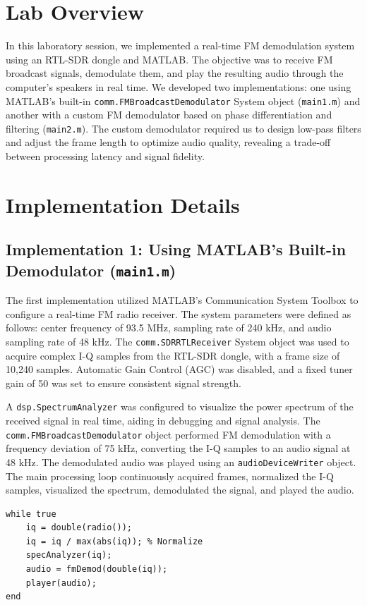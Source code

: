 \documentclass{article}
\begin{document}
\section*{Lab Overview}
In this laboratory session, we implemented a real-time FM demodulation system using an RTL-SDR dongle and MATLAB. The objective was to receive FM broadcast signals, demodulate them, and play the resulting audio through the computer's speakers in real time. We developed two implementations: one using MATLAB's built-in \texttt{comm.FMBroadcastDemodulator} System object (\texttt{main1.m}) and another with a custom FM demodulator based on phase differentiation and filtering (\texttt{main2.m}). The custom demodulator required us to design low-pass filters and adjust the frame length to optimize audio quality, revealing a trade-off between processing latency and signal fidelity.

\section*{Implementation Details}

\subsection*{Implementation 1: Using MATLAB's Built-in Demodulator (\texttt{main1.m})}
The first implementation utilized MATLAB's Communication System Toolbox to configure a real-time FM radio receiver. The system parameters were defined as follows: center frequency of 93.5 MHz, sampling rate of 240 kHz, and audio sampling rate of 48 kHz. The \texttt{comm.SDRRTLReceiver} System object was used to acquire complex I-Q samples from the RTL-SDR dongle, with a frame size of 10,240 samples. Automatic Gain Control (AGC) was disabled, and a fixed tuner gain of 50 was set to ensure consistent signal strength.

A \texttt{dsp.SpectrumAnalyzer} was configured to visualize the power spectrum of the received signal in real time, aiding in debugging and signal analysis. The \texttt{comm.FMBroadcastDemodulator} object performed FM demodulation with a frequency deviation of 75 kHz, converting the I-Q samples to an audio signal at 48 kHz. The demodulated audio was played using an \texttt{audioDeviceWriter} object. The main processing loop continuously acquired frames, normalized the I-Q samples, visualized the spectrum, demodulated the signal, and played the audio.

\begin{lstlisting}[caption={Main processing loop in \texttt{main1.m}},label={lst:main1}]
while true
    iq = double(radio());
    iq = iq / max(abs(iq)); % Normalize
    specAnalyzer(iq);
    audio = fmDemod(double(iq));
    player(audio);
end
\end{lstlisting}
\end{document}
